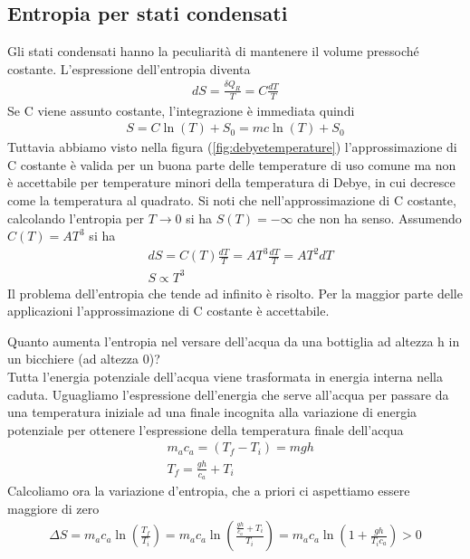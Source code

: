 \documentclass[
10pt, %
a4paper, %
oneside, %
headinclude,footinclude, %
BCOR5mm, %
]{scrartcl}
\begin{document}
\subsection{Entropia per stati condensati}
Gli stati condensati hanno la peculiarità di mantenere il volume pressoché costante. L'espressione dell'entropia diventa
\begin{align*}
	dS = \frac{\delta Q_R}{T}=C\frac{dT}{T}
\end{align*}
Se C viene assunto costante, l'integrazione è immediata quindi
\begin{align*}
	S = C \ln(T)+S_0 = m c \ln(T)+S_0
\end{align*}
Tuttavia abbiamo visto nella figura (\ref{fig:debyetemperature}) l'approssimazione di C costante è valida per un buona parte delle temperature di uso comune ma non è accettabile per temperature minori della temperatura di Debye, in cui decresce come la temperatura al quadrato. Si noti che nell'approssimazione di C costante, calcolando l'entropia per \(T \to 0 \) si ha \(S(T) = -\infty\) che non ha senso. Assumendo \(C(T) = AT^3\) si ha
\begin{align*}
	&dS = C(T)\frac{dT}{T} = AT^3 \frac{dT}{T} = AT^2 dT\\
	&S \propto T^3
\end{align*}
Il problema dell'entropia che tende ad infinito è risolto. Per la maggior parte delle applicazioni l'approssimazione di C costante è accettabile. 
\begin{exercise}
	Quanto aumenta l'entropia nel versare dell'acqua da una bottiglia ad altezza h in un bicchiere (ad altezza 0)?\\
	Tutta l'energia potenziale dell'acqua viene trasformata in energia interna nella caduta. Uguagliamo l'espressione dell'energia che serve all'acqua per passare da una temperatura iniziale ad una finale incognita alla variazione di energia potenziale per ottenere l'espressione della temperatura finale dell'acqua
	\begin{align*}
		&m_a c_a = (T_f - T_i) = mgh\\
		&T_f = \frac{gh}{c_a}+T_i
	\end{align*}
	Calcoliamo ora la variazione d'entropia, che a priori ci aspettiamo essere maggiore di zero
	\begin{align*}
		\Delta S = m_a c_a \ln\left(\frac{T_f}{T_i}\right) = m_a c_a \ln\left(\frac{ \frac{gh}{c_a}+T_i}{T_i}\right) = m_a c_a \ln \left(1+ \frac{gh}{T_ic_a}\right)>0
	\end{align*}
\end{exercise}
\end{document}
